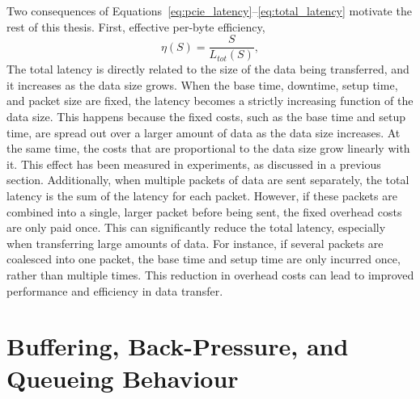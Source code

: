 Two consequences of Equations~\ref{eq:pcie_latency}--\ref{eq:total_latency} motivate the rest of this thesis. First, effective per-byte efficiency,
\begin{equation}
\eta(S) = \frac{S}{L_{tot}(S)},
\label{eq:efficiency}
\end{equation}
The total latency is directly related to the size of the data being transferred, and it increases as the data size grows. When the base time, downtime, setup time, and packet size are fixed, the latency becomes a strictly increasing function of the data size. This happens because the fixed costs, such as the base time and setup time, are spread out over a larger amount of data as the data size increases. At the same time, the costs that are proportional to the data size grow linearly with it. This effect has been measured in experiments, as discussed in a previous section. Additionally, when multiple packets of data are sent separately, the total latency is the sum of the latency for each packet. However, if these packets are combined into a single, larger packet before being sent, the fixed overhead costs are only paid once. This can significantly reduce the total latency, especially when transferring large amounts of data. For instance, if several packets are coalesced into one packet, the base time and setup time are only incurred once, rather than multiple times. This reduction in overhead costs can lead to improved performance and efficiency in data transfer.


\section{Buffering, Back-Pressure, and Queueing Behaviour}
\label{sec:ch3_queueing}

